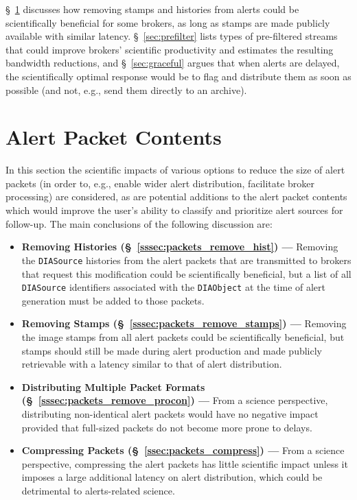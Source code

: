 \documentclass[DM,lsstdraft,authoryear,toc]{lsstdoc}
\begin{document}
\S~\ref{sec:packets} discusses how removing stamps and histories from alerts could be scientifically beneficial for some brokers, as long as stamps are made publicly available with similar latency.
\S~\ref{sec:prefilter} lists types of pre-filtered streams that could improve brokers' scientific productivity and estimates the resulting bandwidth reductions, and \S~\ref{sec:graceful} argues that when alerts are delayed, the scientifically optimal response would be to flag and distribute them as soon as possible (and not, e.g., send them directly to an archive).

\clearpage
\section{Alert Packet Contents} \label{sec:packets}

In this section the scientific impacts of various options to reduce the size of alert packets (in order to, e.g., enable wider alert distribution, facilitate broker processing) are considered, as are potential additions to the alert packet contents which would improve the user's ability to classify and prioritize alert sources for follow-up.
The main conclusions of the following discussion are:
\begin{itemize}
\item {\bf Removing Histories (\S~\ref{sssec:packets_remove_hist}) ---} Removing the {\tt DIASource} histories from the alert packets that are transmitted to brokers that request this modification could be scientifically beneficial, but a list of all {\tt DIASource} identifiers associated with the {\tt DIAObject} at the time of alert generation must be added to those packets. 
\item {\bf Removing Stamps (\S~\ref{sssec:packets_remove_stamps}) ---} Removing the image stamps from all alert packets could be scientifically beneficial, but stamps should still be made during alert production and made publicly retrievable with a latency similar to that of alert distribution.
\item {\bf Distributing Multiple Packet Formats (\S~\ref{sssec:packets_remove_procon}) ---} From a science perspective, distributing non-identical alert packets would have no negative impact provided that full-sized packets do not become more prone to delays.
\item {\bf Compressing Packets (\S~\ref{ssec:packets_compress}) ---} From a science perspective, compressing the alert packets has little scientific impact unless it imposes a large additional latency on alert distribution, which could be detrimental to alerts-related science.
\end{itemize}
\end{document}
